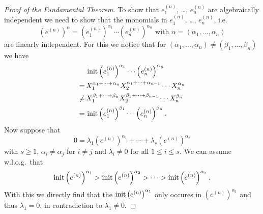 \begin{proof}[Proof of the Fundamental Theorem]
 To show that $e^{(n)}_1$, \dots, $e^{(n)}_n$ are algebraically independent we need to show that the monomials in $e^{(n)}_1$, \dots, $e^{(n)}_n$, i.e.
 \[
  \left(e^{(n)}\right)^\alpha = \left(e^{(n)}_1\right)^{\alpha_1} \dotsm \left(e^{(n)}_n\right)^{\alpha_n} \text{ with } \alpha = (\alpha_1, \dotsc, \alpha_n)
 \]
 are linearly independent. For this we notice that for $(\alpha_1, \dotsc, \alpha_n) \neq (\beta_1, \dotsc, \beta_n)$ we have
 \begin{align*}
      &\, \operatorname{init} \left(e^{(n)}_1\right)^{\alpha_1} \dotsm \left(e^{(n)}_n\right)^{\alpha_n} \\
     =&\, X_1^{\alpha_1 + \dotsb + \alpha_n} X_2^{\alpha_1 + \dotsb + \alpha_{n-1}} \dotsm X_n^{\alpha_n} \\
  \neq&\, X_1^{\beta_1 + \dotsb + \beta_n} X_2^{\beta_1 + \dotsb + \beta_{n-1}} \dotsm X_n^{\beta_n} \\
     =&\, \operatorname{init} \left(e^{(n)}_1\right)^{\beta_1} \dotsm \left(e^{(n)}_n\right)^{\beta_n}.
 \end{align*}
 Now suppose that
 \[
  0 = \lambda_1 \left(e^{(n)}\right)^{\alpha_1} + \dotsb + \lambda_s \left(e^{(n)}\right)^{\alpha_s}
 \]
 with $s \geq 1$, $\alpha_i \neq \alpha_j$ for $i \neq j$ and $\lambda_i \neq 0$ for all $1 \leq i \leq s$. We can assume w.l.o.g.\ that 
 \[
  \operatorname{init} \left(e^{(n)}\right)^{\alpha_1} > \operatorname{init} \left(e^{(n)}\right)^{\alpha_2} > \dotsb > \operatorname{init} \left(e^{(n)}\right)^{\alpha_s}.
 \]
 With this we directly find that the $\operatorname{init} \left(e^{(n)}\right)^{\alpha_1}$ only occures in $\left(e^{(n)}\right)^{\alpha_1}$ and thus $\lambda_1 = 0$, in contradiction to $\lambda_1 \neq 0$.
\end{proof}


